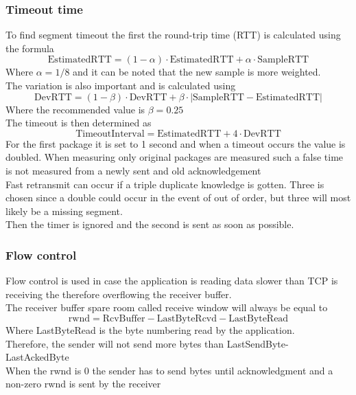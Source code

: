 \documentclass[12pt, a4paper]{article}
\begin{document}
			\subsubsection{Timeout time}
				To find segment timeout the first the round-trip time (RTT) is calculated using the formula
				$$\text{EstimatedRTT}=(1-\alpha)\cdot \text{EstimatedRTT}+\alpha \cdot \text{SampleRTT}$$
				Where $\alpha=1/8$ and it can be noted that the new sample is more weighted.\\
				The variation is also important and is calculated using
				$$\text{DevRTT}=(1-\beta)\cdot \text{DevRTT}+\beta \cdot |\text{SampleRTT}-\text{EstimatedRTT}|$$
				Where the recommended value is $\beta = 0.25$\\
				The timeout is then determined as
				$$\text{TimeoutInterval}=\text{EstimatedRTT}+4\cdot\text{DevRTT}$$
				For the first package it is set to 1 second and when a timeout occurs the value is doubled.
				When measuring only original packages are measured such a false time is not measured from a newly sent and old acknowledgement\\[4mm]
				Fast retransmit can occur if a triple duplicate knowledge is gotten. Three is chosen since a double could occur in the event of out of order, but three will most likely be a missing segment.\\
				Then the timer is ignored and the second is sent as soon as possible.
			\subsubsection{Flow control}
				Flow control is used in case the application is reading data slower than TCP is receiving the therefore overflowing the receiver buffer.\\
				The receiver buffer spare room called receive window will always be equal to 
				$$\text{rwnd}=\text{RcvBuffer}-\text{LastByteRcvd}-\text{LastByteRead}$$
				Where LastByteRead is the byte numbering read by the application.\\
				Therefore, the sender will not send more bytes than LastSendByte-LastAckedByte\\
				When the rwnd is 0 the sender has to send bytes until acknowledgment and a non-zero rwnd is sent by the receiver
\end{document}
